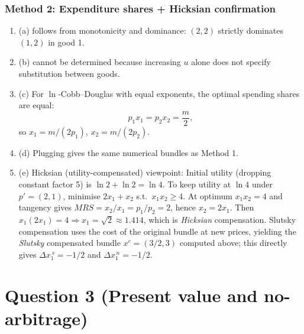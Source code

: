 \documentclass[12pt]{article}
\begin{document}
\subsubsection*{Method 2: Expenditure shares + Hicksian confirmation}
\begin{enumerate}[label=(\alph*), leftmargin=*]
\item (a) follows from monotonicity and dominance: \((2,2)\) strictly dominates \((1,2)\) in good 1.

\item (b) cannot be determined because increasing \(u\) alone does not specify substitution between goods.

\item (c) For \(\ln\)-Cobb--Douglas with equal exponents, the optimal spending shares are equal:
\[
p_1x_1=p_2x_2=\frac{m}{2},
\]
so \(x_1=m/(2p_1)\), \(x_2=m/(2p_2)\).

\item (d) Plugging gives the same numerical bundles as Method 1.

\item (e) Hicksian (utility-compensated) viewpoint:
Initial utility (dropping constant factor 5) is \(\ln 2+\ln 2=\ln 4\).
To keep utility at \(\ln 4\) under \(p'=(2,1)\), minimise \(2x_1+x_2\) s.t.\ \(x_1x_2\ge 4\).
At optimum \(x_1x_2=4\) and tangency gives \(MRS=x_2/x_1=p_1/p_2=2\), hence \(x_2=2x_1\).
Then \(x_1(2x_1)=4\Rightarrow x_1=\sqrt{2}\approx 1.414\), which is \emph{Hicksian} compensation.
Slutsky compensation uses the cost of the original bundle at new prices, yielding the \emph{Slutsky} compensated bundle \(x^c=(3/2,3)\) computed above; this directly gives \(\Delta x_1^{\,s}=-1/2\) and \(\Delta x_1^{\,n}=-1/2\).
\end{enumerate}

\begin{center}
\end{center}

\newpage
\section*{Question 3 (Present value and no-arbitrage)}
\end{document}
